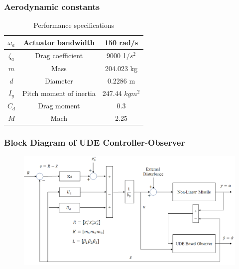 \documentclass[table,10pt,red]{beamer}	%
\begin{document}
 	\begin{frame}
 	\frametitle{Aerodynamic constants}
 	\begin{table}[h]
 		\begin{center}
 			\caption{Performance specifications}\label{tb1}
 			\begin{tabular}{ccc}
 				\hline
 				$\omega_a$ & Actuator bandwidth & 150 rad/s\\ \hline
 				$\zeta_a$ & Drag coefficient & 9000 1/$s^2$\\ \hline
 				$m$ & Mass & 204.023 kg\\ \hline
 				$d$ & Diameter & 0.2286 m \\ \hline
 				$I_y$ & Pitch moment of inertia & 247.44 $kgm^2$\\ \hline
 				$C_d$ & Drag moment & 0.3\\ \hline
 				$M$ & Mach & 2.25 \\ \hline
 				
 			\end{tabular}
 		\end{center}
 	\end{table}
 \end{frame}
 	
	\begin{frame}
	\frametitle{Block Diagram of UDE Controller-Observer}
	\textbf{}
	\begin{figure}
	\includegraphics[width=0.8\linewidth]{block_diag}
	\end{figure}
\end{frame}
\end{document}
